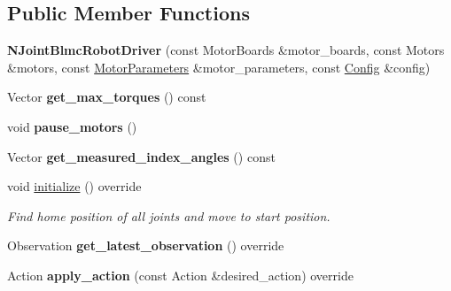 \subsection*{Public Member Functions}
\begin{DoxyCompactItemize}
\item 
{\bfseries N\+Joint\+Blmc\+Robot\+Driver} (const Motor\+Boards \&motor\+\_\+boards, const Motors \&motors, const \hyperlink{structblmc__robots_1_1MotorParameters}{Motor\+Parameters} \&motor\+\_\+parameters, const \hyperlink{structblmc__robots_1_1NJointBlmcRobotDriver_1_1Config}{Config} \&config)\hypertarget{classblmc__robots_1_1NJointBlmcRobotDriver_afecb1d950d3a2e89d51b35d14fa2c703}{}\label{classblmc__robots_1_1NJointBlmcRobotDriver_afecb1d950d3a2e89d51b35d14fa2c703}

\item 
Vector {\bfseries get\+\_\+max\+\_\+torques} () const \hypertarget{classblmc__robots_1_1NJointBlmcRobotDriver_a923c06860fa6aaddd49541b3a836d177}{}\label{classblmc__robots_1_1NJointBlmcRobotDriver_a923c06860fa6aaddd49541b3a836d177}

\item 
void {\bfseries pause\+\_\+motors} ()\hypertarget{classblmc__robots_1_1NJointBlmcRobotDriver_a581bdda9cafb5966425988bc6ca5821f}{}\label{classblmc__robots_1_1NJointBlmcRobotDriver_a581bdda9cafb5966425988bc6ca5821f}

\item 
Vector {\bfseries get\+\_\+measured\+\_\+index\+\_\+angles} () const \hypertarget{classblmc__robots_1_1NJointBlmcRobotDriver_a5c07ab80770b80db37e8471ec3b77685}{}\label{classblmc__robots_1_1NJointBlmcRobotDriver_a5c07ab80770b80db37e8471ec3b77685}

\item 
void \hyperlink{classblmc__robots_1_1NJointBlmcRobotDriver_a41b2ff96e0a687b0e1ae06ce1502d4db}{initialize} () override
\begin{DoxyCompactList}\small\item\em Find home position of all joints and move to start position. \end{DoxyCompactList}\item 
Observation {\bfseries get\+\_\+latest\+\_\+observation} () override\hypertarget{classblmc__robots_1_1NJointBlmcRobotDriver_acfe921e947e9dbe5eb74a7c9fb777dfd}{}\label{classblmc__robots_1_1NJointBlmcRobotDriver_acfe921e947e9dbe5eb74a7c9fb777dfd}

\item 
Action {\bfseries apply\+\_\+action} (const Action \&desired\+\_\+action) override\hypertarget{classblmc__robots_1_1NJointBlmcRobotDriver_a4fbd75b68c4dfa8e9320befd546f406a}{}\label{classblmc__robots_1_1NJointBlmcRobotDriver_a4fbd75b68c4dfa8e9320befd546f406a}


\end{DoxyCompactItemize}
